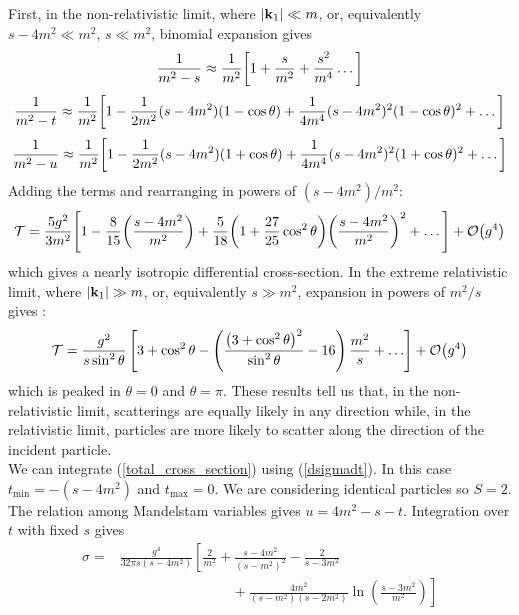 First, in the non-relativistic limit, where $\abs{\vb{k}_1}\ll m$, or, equivalently $s-4m^2\ll m^2$, $s\ll m^2$, binomial expansion gives
\begin{equation}
    \frac{1}{m^2-s}\approx\frac{1}{m^2}\qty[1+\frac{s}{m^2}+\frac{s^2}{m^4}\dots]
\end{equation}
\begin{equation}
    \frac{1}{m^2-t}\approx\frac{1}{m^2}\qty[1-\frac{1}{2m^2}(s-4m^2)(1-\cos\theta)+\frac{1}{4m^4}(s-4m^2)^2(1-\cos\theta)^2+\dots]
\end{equation}
\begin{equation}
    \frac{1}{m^2-u}\approx\frac{1}{m^2}\qty[1-\frac{1}{2m^2}(s-4m^2)(1+\cos\theta)+\frac{1}{4m^4}(s-4m^2)^2(1+\cos\theta)^2+\dots]
\end{equation}
Adding the terms and rearranging in powers of $(s-4m^2)/m^2$:
\begin{equation}
    \mathcal{T}=\frac{5g^2}{3m^2}\qty[1-\frac{8}{15}\qty(\frac{s-4m^2}{m^2})+\frac{5}{18}\qty(1+\frac{27}{25}\cos^2\theta)\qty(\frac{s-4m^2}{m^2})^2+\dots]+\order{g^4}
\end{equation}
which gives a nearly isotropic differential cross-section. In the extreme relativistic limit, where $\abs{\vb{k}_1}\gg m$, or, equivalently $s\gg m^2$, expansion in powers of $m^2/s$ gives :
\begin{equation}
\mathcal{T}=\frac{g^{2}}{s \sin ^{2} \theta}\left[3+\cos ^{2} \theta-\left(\frac{\left(3+\cos ^{2} \theta\right)^{2}}{\sin ^{2} \theta}-16\right) \frac{m^{2}}{s}+\ldots\right]+\order{g^4}
\end{equation}
which is peaked in $\theta=0$ and $\theta=\pi$. These results tell us that, in the non-relativistic limit, scatterings are equally likely in any direction while, in the relativistic limit, particles are more likely to scatter along the direction of the incident particle.\\

We can integrate (\ref{total_cross_section}) using (\ref{dsigmadt}). In this case $t_{\text{min}}=-(s-4m^2)$ and $t_{\text{max}}=0$. We are considering identical particles so $S=2$. The relation among Mandelstam variables gives $u=4m^2-s-t$. Integration over $t$ with fixed $s$ gives
\begin{equation}
\begin{aligned}
\sigma=&\frac{g^{4}}{32 \pi s\left(s-4 m^{2}\right)}\left[\frac{2}{m^{2}}+\frac{s-4 m^{2}}{\left(s-m^{2}\right)^{2}}-\frac{2}{s-3 m^{2}}\right.
\\
&\left.\qquad\qquad\qquad\qquad+\frac{4 m^{2}}{\left(s-m^{2}\right)\left(s-2 m^{2}\right)} \ln \left(\frac{s-3 m^{2}}{m^{2}}\right)\right]  
\end{aligned}{}
\end{equation}

